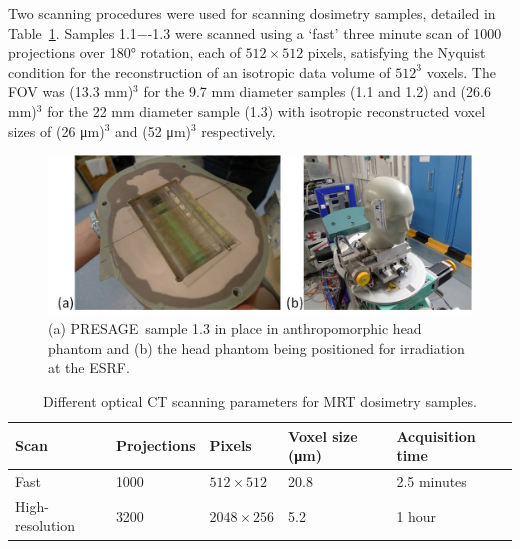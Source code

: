	Two scanning procedures were used for scanning dosimetry samples, detailed in Table~\ref{table:scansettings}. Samples 1.1−-1.3 were scanned using a `fast' three minute scan of 1000 projections over \ang{180} rotation, each of $512 \times 512$ pixels, satisfying the Nyquist condition for the reconstruction of an isotropic data volume of $512^3$ voxels. The FOV was (13.3 mm)$^3$ for the 9.7 mm diameter samples (1.1 and 1.2) and (26.6 mm)$^3$ for the 22 mm diameter sample (1.3) with isotropic reconstructed voxel sizes of (26 \si{\um})$^3$ and (52 \si{\um})$^3$ respectively.
	
	\begin{figure}
		\centering
		\includegraphics[width=0.9\linewidth]{mrt_img/mrt_Fig1}
		\caption{(a) PRESAGE\textregistered \ sample 1.3 in place in anthropomorphic head phantom and (b) the head phantom being positioned for irradiation at the ESRF.}
		\label{fig:Fig1christopher}
	\end{figure}
	

	
	
	
	
	
	\begin{table}
		\centering
		\begin{tabular}{ p{2.3cm}  p{2.5cm} p{2.5cm}  p{2.3cm} p{2.5cm}  }
			\hline
			\textbf{Scan} & \textbf{Projections} &\textbf{Pixels}   &\textbf{Voxel size (\si{\um})} & \textbf{Acquisition time} \\ \hline 
			Fast  & 1000 & $512\times 512$  & 20.8 & 2.5 minutes \\ %
			High-resolution & 3200 & $2048\times 256$ &  5.2 & 1 hour \\ 
			\hline
		\end{tabular}
		\caption{Different optical CT scanning parameters for MRT dosimetry samples.}
		\label{table:scansettings}
	\end{table}
	
